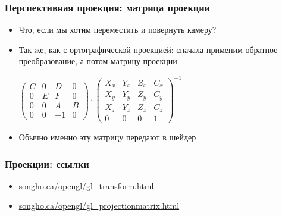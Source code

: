 \documentclass{beamer}
\begin{document}
\begin{frame}[fragile]
\frametitle{Перспективная проекция: матрица проекции}
\begin{itemize}
\item Что, если мы хотим переместить и повернуть камеру?
\pause
\item Так же, как с ортографической проекцией: сначала применим обратное преобразование, а потом матрицу проекции
\pause
\begin{center}
\begin{math}
\begin{pmatrix}
C & 0 & D & 0 \\
0 & E & F & 0 \\
0 & 0 & A & B \\
0 & 0 & -1 & 0
\end{pmatrix}
\cdot
\begin{pmatrix}
X_x & Y_x & Z_x & C_x \\
X_y & Y_y & Z_y & C_y \\
X_z & Y_z & Z_z & C_z \\
0 & 0 & 0 & 1
\end{pmatrix}^{-1}
\end{math}
\end{center}
\pause
\item Обычно именно эту матрицу передают в шейдер
\end{itemize}
\end{frame}

\begin{frame}[fragile]
\frametitle{Проекции: ссылки}
\begin{itemize}
\item \href{http://songho.ca/opengl/gl_transform.html}{songho.ca/opengl/gl\_transform.html}
\item \href{http://songho.ca/opengl/gl_projectionmatrix.html}{songho.ca/opengl/gl\_projectionmatrix.html}
\end{itemize}
\end{frame}
\end{document}
